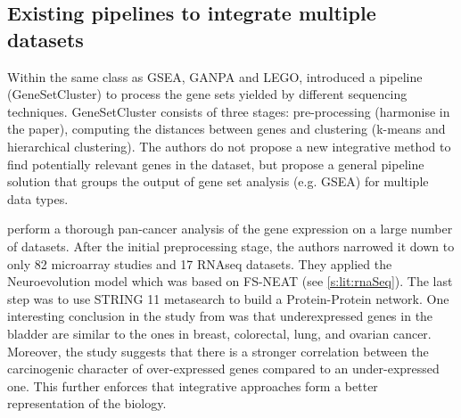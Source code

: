 


\subsection*{Existing pipelines to integrate multiple datasets} \label{s:pipelines}


Within the same class as GSEA, GANPA\cite{Fan2020-yb} and LEGO\cite{Dong2016-zs}, \citet{Ewing2020-os} introduced a pipeline (GeneSetCluster) to process the gene sets yielded by different sequencing techniques. GeneSetCluster consists of three stages: pre-processing (harmonise in the paper), computing the distances between genes and clustering (k-means and hierarchical clustering). The authors do not propose a new integrative method to find potentially relevant genes in the dataset, but propose a general pipeline solution that groups the output of gene set analysis (e.g. GSEA) for multiple data types.

\citet{Feltes2020-bz} perform a thorough pan-cancer analysis of the gene expression on a large number of datasets. After the initial preprocessing stage, the authors narrowed it down to only 82 microarray studies and 17 RNAseq datasets. They applied the Neuroevolution model\cite{Grisci2019-xn} which was based on FS-NEAT\cite{Whiteson2005-dn} (see \cref{s:lit:rnaSeq}). The last step was to use STRING 11\cite{Szklarczyk2019-pu} metasearch to build a Protein-Protein network. One interesting conclusion in the study from \citet{Feltes2020-bz} was that underexpressed genes in the bladder are similar to the ones in breast, colorectal, lung, and ovarian cancer. Moreover, the study suggests that there is a stronger correlation between the carcinogenic character of over-expressed genes compared to an under-expressed one. This further enforces that integrative approaches form a better representation of the biology.

